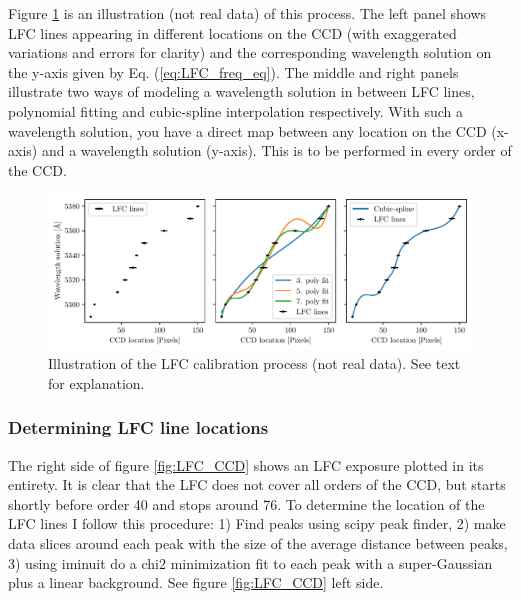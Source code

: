     Figure \ref{fig:calib_illustration} is an illustration (not real data) of this process. The left panel shows LFC lines appearing in different locations on the CCD (with exaggerated variations and errors for clarity) and the corresponding wavelength solution on the y-axis given by Eq. (\ref{eq:LFC_freq_eq}). The middle and right panels illustrate two ways of modeling a wavelength solution in between LFC lines, polynomial fitting and cubic-spline interpolation respectively. With such a wavelength solution, you have a direct map between any location on the CCD (x-axis) and a wavelength solution (y-axis). This is to be performed in every order of the CCD.

    \begin{figure}%
        \begin{wide}  
            \includegraphics[width=\textwidth]{figures/calib/calib_illustration.pdf}
            \caption{Illustration of the LFC calibration process (not real data). See text for explanation.}
            \label{fig:calib_illustration}
        \end{wide}
    \end{figure}

    \subsubsection{Determining LFC line locations}
    The right side of figure \ref{fig:LFC_CCD} shows an LFC exposure plotted in its entirety. It is clear that the LFC does not cover all orders of the CCD, but starts shortly before order 40 and stops around 76. To determine the location of the LFC lines I follow this procedure: 1) Find peaks using scipy peak finder, 2) make data slices around each peak with the size of the average distance between peaks, 3) using iminuit do a chi2 minimization fit to each peak with a super-Gaussian plus a linear background. See figure \ref{fig:LFC_CCD} left side.

